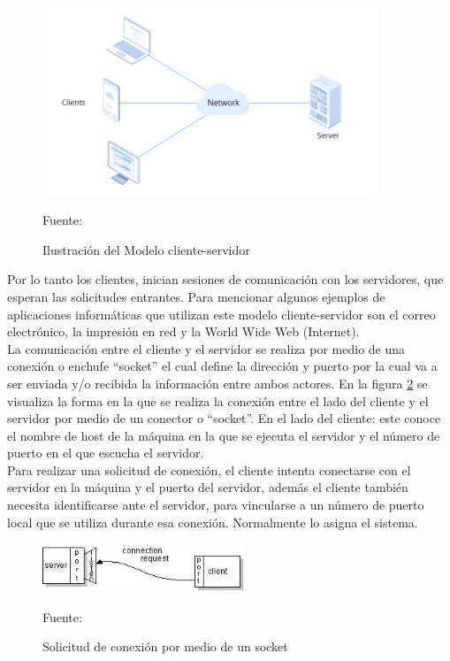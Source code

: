 \begin{figure}[H]
    \begin{center}
        \includegraphics[width=10cm]{img/capitulo_2/client-server.jpeg}
        \caption{Ilustración del Modelo cliente-servidor\\}
        Fuente: \cite{clientserver}
        \label{fig:client_server}
    \end{center}
\end{figure}

Por lo tanto los clientes, inician sesiones de comunicación con los servidores, que esperan las solicitudes entrantes. Para mencionar algunos ejemplos de aplicaciones informáticas que utilizan este modelo cliente-servidor son el correo electrónico, la impresión en red y la World Wide Web (Internet).\\

La comunicación entre el cliente y el servidor se realiza por medio de una conexión o enchufe ``socket'' el cual define la dirección y puerto por la cual va a ser enviada y/o recibida la información entre ambos actores. En la figura \ref{fig:socket_request} se visualiza la forma en la que se realiza la conexión entre el lado del cliente y el servidor por medio de un conector o ``socket''. En el lado del cliente: este conoce el nombre de host de la máquina en la que se ejecuta el servidor y el número de puerto en el que escucha el servidor.\\

Para realizar una solicitud de conexión, el cliente intenta conectarse con el servidor en la máquina y el puerto del servidor, además el cliente también necesita identificarse ante el servidor, para vincularse a un número de puerto local que se utiliza durante esa conexión. Normalmente lo asigna el sistema.\\

\begin{figure}[H]
    \begin{center}
        \includegraphics[width=6cm]{img/capitulo_2/socket_request.jpg}
        \caption{Solicitud de conexión por medio de un socket\\}
        Fuente: \cite{socketconnection}
        \label{fig:socket_request}
    \end{center}
\end{figure}


